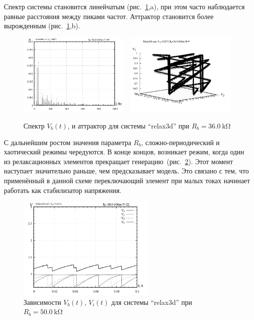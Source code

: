 Спектр системы становится линейчатым (рис.~\ref{atu:f:relax3d_f_09},a), при этом
часто наблюдается равные расстояния между пиками частот.
Аттрактор становится более вырожденным (рис.~\ref{atu:f:relax3d_f_09},b).

\begin{figure}[htb!]
  \centerline{
    \includegraphics[width=0.48\textwidth]{p/relax3d_f_09.png}
    ~
    \includegraphics[width=0.48\textwidth]{p/relax3d_v1v2v3_09.png}
  }
  \caption{Спектр $V_b(t)$, и аттрактор для системы ``relax3d'' при $R_b=\SI{36.0}{\kilo\ohm}$ }
  \label{atu:f:relax3d_f_09}
\end{figure}

С дальнейшим ростом значения параметра $R_b$, сложно-периодический и хаотический
режимы чередуются. В конце концов, возникает режим, когда
один из релаксационных элементов прекращает генерацию~(рис.~\ref{atu:f:relax3d_t_22}).
Этот момент наступает значительно раньше, чем предсказывает
модель. Это связано с тем, что применённый в данной схеме переключающий элемент
при малых токах начинает работать как стабилизатор напряжения.

\begin{figure}[htb!]
  \centerline{\includegraphics[width=0.6\textwidth]{p/relax3d_t_22.png} }
  \caption{Зависимости $V_b(t)$, $V_i(t)$ для системы ``relax3d'' при $R_b=\SI{50.0}{\kilo\ohm}$ }
  \label{atu:f:relax3d_t_22}
\end{figure}

